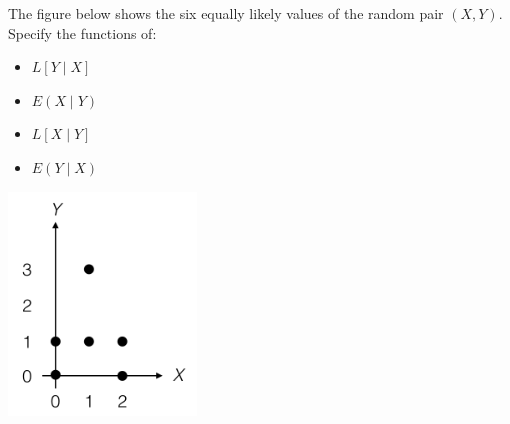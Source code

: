 \question The figure below shows the six equally likely values of the 
random pair $(X, Y)$. Specify the functions of:
\begin{itemize}
    \item $L[Y\mid X]$
    \item $E(X\mid Y)$
    \item $L[X\mid Y]$
    \item $E(Y\mid X)$
\end{itemize}

\begin{center}
    \includegraphics[width=5cm]{find_from_graph.jpg}
\end{center}

